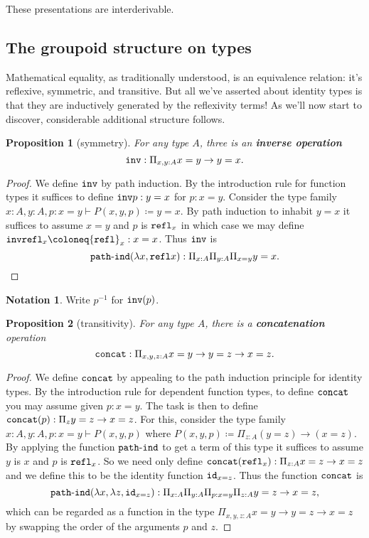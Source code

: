 \documentclass{amsart}
\theoremstyle{theorem}
\newtheorem*{prop}{Proposition}
\theoremstyle{definition}
\newtheorem*{ntn}{Notation}
\theoremstyle{remark}
\newcommand{\0}{\mathbbe{0}}
\newcommand{\1}{\mathbbe{1}}
\newcommand{\2}{\mathbbe{2}}
\newcommand{\3}{\mathbbe{3}}
\newcommand{\4}{\mathbbe{4}}
\newcommand{\term}[1]{{\textup{\texttt{#1}}}}
\newcommand{\id}{\term{id}}
\newcommand{\refl}{\term{refl}}
\newcommand{\pathind}{\term{path}\text{-}\term{ind}}
\newcommand{\concat}{\term{concat}}
\newcommand{\inv}{\term{inv}}
\begin{document}
These presentations are interderivable.

\subsection*{The groupoid structure on types}

Mathematical equality, as traditionally understood, is an equivalence relation: it's reflexive, symmetric, and transitive. But all we've asserted about identity types is that they are inductively generated by the reflexivity terms! As we'll now start to discover, considerable additional structure follows.

\begin{prop}[symmetry] For any type $A$, three is an  \textbf{inverse operation}
\[ \inv : \Pi_{x, y :A} x = y \to y =x.\]
\end{prop}
\begin{proof}
We define $\inv$ by path induction. By the introduction rule for function types it suffices to define $\inv p : y =x$ for $p : x = y$. Consider the type family $x : A, y : A, p: x = y \vdash P(x,y,p) \coloneq y = x$. By path induction to inhabit $y=x$ it suffices to assume $x = y$ and $p$ is $\refl_x$ in which case we may define $\inv \refl_x \coloneq \refl_x : x=x$. Thus $\inv$ is
\[ \pathind (\lambda x, \refl x) : \Pi_{x :A} \Pi_{y :A} \Pi_{x = y} y =x.\]
\end{proof}

\begin{ntn} Write $p^{-1}$ for $\inv(p)$.
\end{ntn}

\begin{prop}[transitivity]
For any type $A$, there is a  \textbf{concatenation} operation
\[ \concat : \Pi_{x,y,z :A} x= y \to y=z \to x = z.\] 
\end{prop}
\begin{proof}
We define $\concat$ by appealing to the path induction principle for identity types. 
By the introduction rule for dependent function types, to define $\concat$ you may assume given $p : x=y$. The task is then to define $\concat (p) : \Pi_{z} y =z \to x = z$.  For this, consider the type family $x :A , y : A, p : x = y \vdash P(x,y,p)$ where $P(x,y,p) \coloneq \Pi_{z : A} (y = z) \to (x = z)$. By applying the function $\pathind$ to get a term of this type it suffices to assume $y$ is $x$ and $p$ is $\refl_x$. So we need only define $\concat( \refl_x) : \Pi_{z :A} x =z \to x = z$ and we define this to be the identity function $\id_{x = z}$. Thus the function $\concat$ is 
\[  \pathind( \lambda x, \lambda z, \id_{x=z}) : \Pi_{x :A}\Pi_{y :A} \Pi_{p : x = y} \Pi_{z :A} y=z \to x =z,\]
which can be regarded as a function in the type $\Pi_{x,y,z :A} x= y \to y=z \to x = z$ by swapping the order of the arguments $p$ and $z$.
\end{proof}
\end{document}

